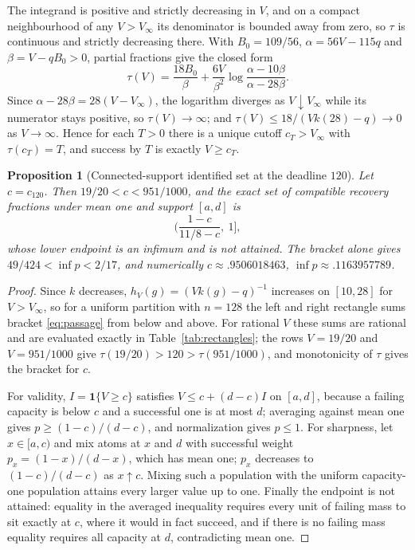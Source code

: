 \documentclass[11pt]{article}
\newtheorem{proposition}[theorem]{Proposition}
\theoremstyle{definition}
\newcommand{\ind}{\mathbf 1}
\begin{document}
The integrand is positive and strictly decreasing in $V$, and on a compact
neighbourhood of any $V>V_\infty$ its denominator is bounded away from zero, so
$\tau$ is continuous and strictly decreasing there. With
$B_0=109/56$, $\alpha=56V-115q$ and $\beta=V-qB_0>0$, partial fractions give
the closed form
\begin{equation}\label{eq:log}
  \tau(V)=\frac{18B_0}\beta+\frac{6V}{\beta^2}
  \log\frac{\alpha-10\beta}{\alpha-28\beta}.
\end{equation}
Since $\alpha-28\beta=28(V-V_\infty)$, the logarithm diverges as
$V\downarrow V_\infty$ while its numerator stays positive, so
$\tau(V)\to\infty$; and $\tau(V)\le18/(Vk(28)-q)\to0$ as $V\to\infty$. Hence
for each $T>0$ there is a unique cutoff $c_T>V_\infty$ with $\tau(c_T)=T$, and
success by $T$ is exactly $V\ge c_T$.

\begin{proposition}[Connected-support identified set at the deadline
$120$]\label{prop:connected}
Let $c=c_{120}$. Then $19/20<c<951/1000$, and the exact set of compatible
recovery fractions under mean one and support $[a,d]$ is
\begin{equation}\label{eq:connected}
  \Big(\frac{1-c}{11/8-c},\ 1\Big],
\end{equation}
whose lower endpoint is an infimum and is \emph{not} attained. The bracket
alone gives $49/424<\inf p<2/17$, and numerically
$c\approx.9506018463$, $\inf p\approx.1163957789$.
\end{proposition}
\begin{proof}
Since $k$ decreases, $h_V(g)=(Vk(g)-q)^{-1}$ increases on $[10,28]$ for
$V>V_\infty$, so for a uniform partition with $n=128$ the left and right
rectangle sums bracket \eqref{eq:passage} from below and above. For rational
$V$ these sums are rational and are evaluated exactly in
Table~\ref{tab:rectangles}; the rows $V=19/20$ and $V=951/1000$ give
$\tau(19/20)>120>\tau(951/1000)$, and monotonicity of $\tau$ gives the
bracket for $c$.

For validity, $I=\ind\{V\ge c\}$ satisfies $V\le c+(d-c)I$ on $[a,d]$, because
a failing capacity is below $c$ and a successful one is at most $d$; averaging
against mean one gives $p\ge(1-c)/(d-c)$, and normalization gives $p\le1$. For
sharpness, let $x\in[a,c)$ and mix atoms at $x$ and $d$ with successful weight
$p_x=(1-x)/(d-x)$, which has mean one; $p_x$ decreases to $(1-c)/(d-c)$ as
$x\uparrow c$. Mixing such a population with the uniform capacity-one
population attains every larger value up to one. Finally the endpoint is not
attained: equality in the averaged inequality requires every unit of failing
mass to sit exactly at $c$, where it would in fact succeed, and if there is no
failing mass equality requires all capacity at $d$, contradicting mean one.
\end{proof}
\end{document}
